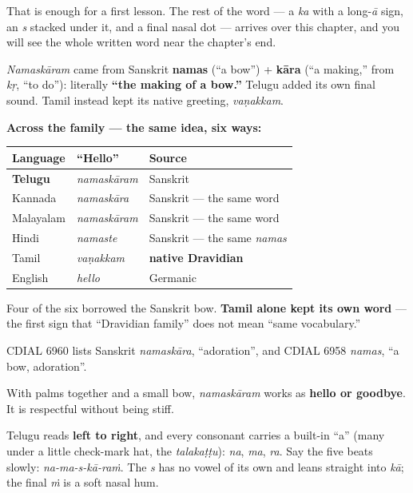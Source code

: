 That is enough for a first lesson. The rest of the word — a \emph{ka} with a long-\emph{ā} sign, an \emph{s} stacked under it, and a final nasal dot — arrives over this chapter, and you will see the whole written word near the chapter's end.

\begin{cousinweb}
\emph{Namaskāram} came from Sanskrit \textbf{namas} (“a bow”) + \textbf{kāra} (“a making,” from \emph{kṛ}, “to do”): literally \textbf{“the making of a bow.”} Telugu added its own final sound. Tamil instead kept its native greeting, \emph{vaṇakkam}.

\textbf{Across the family — the same idea, six ways:}

\noindent
\begin{tabularx}{\linewidth}{@{}>{\raggedright\arraybackslash}X>{\raggedright\arraybackslash}X>{\raggedright\arraybackslash}X@{}}
\toprule
\textbf{Language} & \textbf{\textquotedblleft{}Hello\textquotedblright{}} & \textbf{Source} \\
\midrule
\textbf{Telugu} & \emph{namaskāram} & Sanskrit \\
Kannada & \emph{namaskāra} & Sanskrit — the same word \\
Malayalam & \emph{namaskāram} & Sanskrit — the same word \\
Hindi & \emph{namaste} & Sanskrit — the same \emph{namas} \\
Tamil & \emph{vaṇakkam} & \textbf{native Dravidian} \\
English & \emph{hello} & Germanic \\
\bottomrule
\end{tabularx}

Four of the six borrowed the Sanskrit bow. \textbf{Tamil alone kept its own word} — the first sign that \textquotedblleft{}Dravidian family\textquotedblright{} does not mean \textquotedblleft{}same vocabulary.\textquotedblright{}

CDIAL 6960 lists Sanskrit \emph{namaskāra}, \textquotedblleft{}adoration\textquotedblright{}, and CDIAL 6958 \emph{namas}, \textquotedblleft{}a bow, adoration\textquotedblright{}.
\end{cousinweb}

\begin{culture}
With palms together and a small bow, \emph{namaskāram} works as \textbf{hello or goodbye}. It is respectful without being stiff.
\end{culture}

\begin{sounds}
Telugu reads \textbf{left to right}, and every consonant carries a built-in \textquotedblleft{}a\textquotedblright{} (many under a little check-mark hat, the \emph{talakaṭṭu}):  \emph{na},  \emph{ma},  \emph{ra}. Say the five beats slowly: \emph{na-ma-s-kā-raṁ}. The \emph{s} has no vowel of its own and leans straight into \emph{kā}; the final \emph{ṁ} is a soft nasal hum.
\end{sounds}

